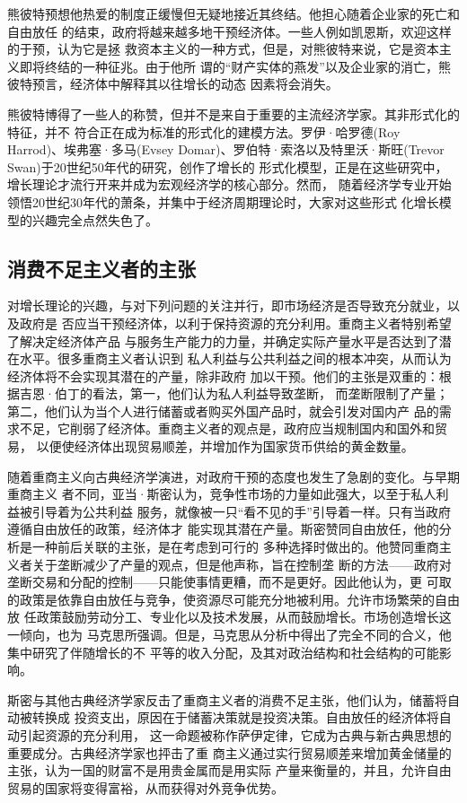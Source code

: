 熊彼特预想他热爱的制度正缓慢但无疑地接近其终结。他担心随着企业家的死亡和自由放任
的结束，政府将越来越多地干预经济体。一些人例如凯恩斯，欢迎这样的于预，认为它是拯
救资本主义的一种方式，但是，对熊彼特来说，它是资本主义即将终结的一种征兆。由于他所
谓的“财产实体的燕发”以及企业家的消亡，熊彼特预言，经济体中解释其以往增长的动态
因素将会消失。

熊彼特博得了一些人的称赞，但并不是来自于重要的主流经济学家。其非形式化的特征，并不
符合正在成为标准的形式化的建模方法。罗伊·哈罗德(Roy Harrod)、埃弗塞·多马(Evsey
Domar)、罗伯特·索洛以及特里沃·斯旺(Trevor Swan)于20世纪50年代的研究，创作了增长的
形式化模型，正是在这些研究中，增长理论才流行开来并成为宏观经济学的核心部分。然而，
随着经济学专业开始领悟20世纪30年代的萧条，并集中于经济周期理论时，大家对这些形式
化增长模型的兴趣完全点然失色了。

\subsection{消费不足主义者的主张}

对增长理论的兴趣，与对下列问题的关注并行，即市场经济是否导致充分就业，以及政府是
否应当干预经济体，以利于保持资源的充分利用。重商主义者特别希望了解决定经济体产品
与服务生产能力的力量，并确定实际产量水平是否达到了潜在水平。很多重商主义者认识到
私人利益与公共利益之间的根本冲突，从而认为经济体将不会实现其潜在的产量，除非政府
加以干预。他们的主张是双重的：根据吉恩·伯丁的看法，第一，他们认为私人利益导致垄断，
而垄断限制了产量；第二，他们认为当个人进行储蓄或者购买外国产品时，就会引发对国内产
品的需求不足，它削弱了经济体。重商主义者的观点是，政府应当规制国内和国外和贸易，
以便使经济体出现贸易顺差，并增加作为国家货币供给的黄金数量。

随着重商主义向古典经济学演进，对政府干预的态度也发生了急剧的变化。与早期重商主义
者不同，亚当·斯密认为，竞争性市场的力量如此强大，以至于私人利益被引导着为公共利益
服务，就像被一只“看不见的手”引导着一样。只有当政府遵循自由放任的政策，经济体才
能实现其潜在产量。斯密赞同自由放任，他的分析是一种前后关联的主张，是在考虑到可行的
多种选择时做出的。他赞同重商主义者关于垄断减少了产量的观点，但是他声称，旨在控制垄
断的方法——政府对垄断交易和分配的控制——只能使事情更糟，而不是更好。因此他认为，更
可取的政策是依靠自由放任与竞争，使资源尽可能充分地被利用。允许市场繁荣的自由放
任政策鼓励劳动分工、专业化以及技术发展，从而鼓励增长。市场创造增长这一倾向，也为
马克思所强调。但是，马克思从分析中得出了完全不同的合义，他集中研究了伴随增长的不
平等的收入分配，及其对政治结构和社会结构的可能影响。

斯密与其他古典经济学家反击了重商主义者的消费不足主张，他们认为，储蓄将自动被转换成
投资支出，原因在于储蓄决策就是投资决策。自由放任的经济体将自动引起资源的充分利用，
这一命题被称作萨伊定律，它成为古典与新古典思想的重要成分。古典经济学家也抨击了重
商主义通过实行贸易顺差来增加黄金储量的主张，认为一国的财富不是用贵金属而是用实际
产量来衡量的，并且，允许自由贸易的国家将变得富裕，从而获得对外竞争优势。

